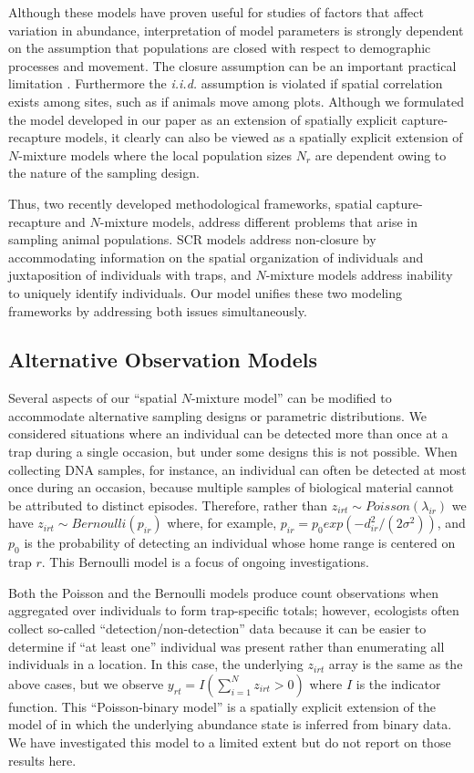 Although these models have proven useful for studies of factors that
affect variation in abundance, interpretation of model parameters is
strongly dependent on the assumption that populations are
closed with respect to demographic processes and movement. The closure
assumption can be an important practical limitation
\citep[but see][]{dail_madsen:2011, chandler_etal:2011}. Furthermore the
{\it i.i.d.} assumption is violated if spatial
correlation exists among sites, such as if animals move among plots.
Although we formulated the model developed in our paper as
an extension of spatially explicit capture-recapture models, it
clearly can
also be viewed as a spatially explicit extension of $N$-mixture models
where the local population sizes $N_{r}$ are dependent owing to the
nature of the sampling design.

Thus, two recently developed methodological frameworks, spatial
capture-recapture and $N$-mixture models, address
different problems that arise in sampling animal populations. SCR
models address non-closure by accommodating information on
the spatial organization of individuals and
juxtaposition of individuals with traps, and $N$-mixture models address
inability to uniquely identify individuals.
Our model unifies these two modeling frameworks by
addressing both issues simultaneously.


\subsection{Alternative Observation Models}
\label{ss:ext}

Several aspects of our ``spatial $N$-mixture model'' can be modified
to accommodate
alternative sampling designs or parametric distributions.
We considered situations where an individual can be detected more than
once at a trap during a single occasion, but under some designs this
is not possible. When collecting DNA samples, for instance, an
individual can often be detected at most once during an
occasion, because multiple samples of biological material cannot be
attributed
to distinct episodes. Therefore, rather than $z_{irt} \sim Poisson(\lambda_{ir})$
we have $z_{irt} \sim Bernoulli(p_{ir})$ where, for example,  $p_{ir} = p_0
exp(-d_{ir}^2/(2\sigma^2))$, and $p_0$ is the probability of
detecting an individual whose home range is centered on trap $r$. This
Bernoulli model is a focus of ongoing investigations.

Both the Poisson and the Bernoulli models
produce count observations when aggregated over individuals to form
trap-specific totals; however, ecologists often collect so-called
``detection/non-detection'' data because it can be easier to determine
if ``at least one'' individual was present rather than enumerating all
individuals in a location. In this case, the underlying $z_{irt}$
array is the same as the above cases, but we observe $y_{rt} =
I(\sum_{i=1}^{N} z_{irt} > 0)$ where $I$ is the indicator
function. This ``Poisson-binary model'' is
a spatially explicit extension of the model of
\citet{royle_nichols:2003} in which the underlying abundance state
is inferred from binary data. We have investigated this model to a
limited extent but do not report on those results here.


